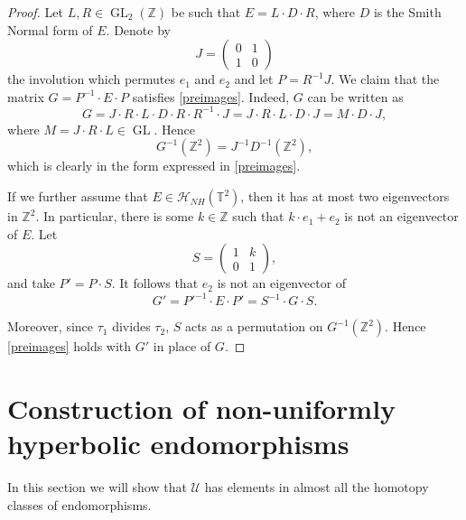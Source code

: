 \documentclass[11pt,letterpaper,reqno]{article}
\newcommand{\Tor}{\mathbb{T}^2}
\newcommand{\Z}{\mathbb{Z}}
\newcommand{\ZZ}{\mathbb{Z}^2}
\DeclareMathOperator{\GL}{GL}
\begin{document}
\begin{proof}
Let $L,R \in \GL_2(\Z)$ be such that $E = L\cdot D\cdot R$, where $D$ is the Smith Normal form of $E$. Denote by 
\[J = \left( \begin{matrix}
0 & 1 \\
1 & 0 \end{matrix}\right) \]
the involution which permutes $e_1$ and $e_2$ and let $P = R^{-1}J$.  We claim that  the matrix $G = P^{-1}\cdot E\cdot P$ satisfies \eqref{preimages}. Indeed, $G$ can be written as 
\[
G =  J\cdot R\cdot L\cdot D\cdot R\cdot R^{-1}\cdot J = J\cdot R\cdot L\cdot D\cdot J = M\cdot D\cdot J,
\]
where $M = J\cdot R\cdot L\in\GL$. Hence
\[
G^{-1}(\ZZ) = J^{-1}D^{-1}(\ZZ),
\]
which is clearly in the form expressed in \eqref{preimages}.

\smallskip 
 

If we further assume that $E\in \mathscr{H}_{NH}(\Tor)$, then it has at most two eigenvectors in $\ZZ$. In particular, there is some $k \in \Z$ such that $k\cdot e_1+e_2$ is not an eigenvector of $E$. Let 
\[S = \left(\begin{matrix}
1 & k \\
0 & 1
\end{matrix} \right),\]
and take $ P' = P\cdot S$. It follows that $e_2$ is not an eigenvector of 
\[
G' = {P'}^{-1}\cdot E \cdot P' = S^{-1}\cdot G\cdot S.
\]

Moreover, since $\tau_1$ divides $\tau_2$, $S$ acts as a permutation on $G^{-1}(\ZZ)$. Hence \eqref{preimages} holds with $G'$ in place of $G$.
\end{proof}



\section{Construction of non-uniformly hyperbolic endomorphisms}\label{sec:shears}

In this section we will show that $\mathcal U$ has elements in almost all the homotopy classes of endomorphisms.
\end{document}
